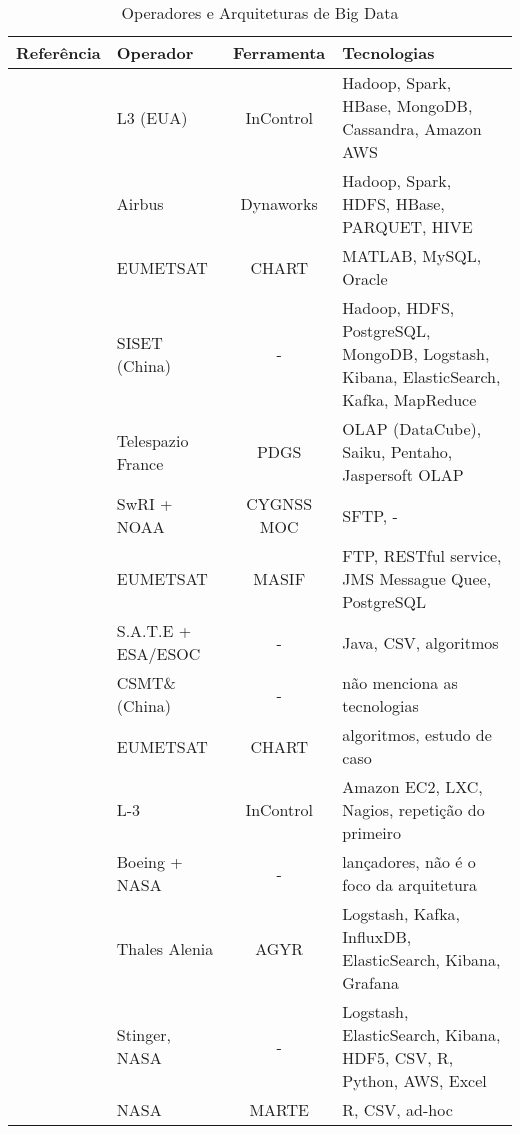 \begin{table}[!ht]%
  \begin{center}
  \caption{Operadores e Arquiteturas de Big Data}
  \begin{tabular}{|C{8em}|C{6em}|c|C{10em}|}
      \hline
	  \bfseries Referência &\bfseries Operador &\bfseries Ferramenta &\bfseries Tecnologias \\
	  \hline
	  \cite{adamskiDataAnalyticsLarge2016} & L3 (EUA) & InControl & Hadoop, Spark, HBase, MongoDB, Cassandra, Amazon AWS \\
	  \hline
	  \cite{boussoufBigDataBased2018} & Airbus & Dynaworks & Hadoop, Spark, HDFS, HBase, PARQUET, HIVE \\
	  \hline
	  \cite{schulsterCHARTingFutureOffline2018} & EUMETSAT & CHART & MATLAB, MySQL, Oracle \\
	  \hline
	  \cite{zhangBigDataFramework2017} & SISET (China) & - & Hadoop, HDFS, PostgreSQL, MongoDB, Logstash, Kibana, ElasticSearch, Kafka, MapReduce \\
	  \hline
	  \cite{yvernesCopernicusGroundSegment2018} & Telespazio France & PDGS & OLAP (DataCube), Saiku, Pentaho, Jaspersoft OLAP \\
	  \hline
	  \cite{dischnerCYGNSSMOCMeeting2016} & SwRI + NOAA & CYGNSS MOC & SFTP, - \\
	  \hline
	  \cite{edwardsDealingBigData2018} & EUMETSAT & MASIF & FTP, RESTful service, JMS Messague Quee, PostgreSQL \\
	  \hline
	  \cite{evansDataMiningDrastically2016} & S.A.T.E + ESA/ESOC & - & Java, CSV, algoritmos \\
	  \hline
	  \cite{fenManagementOperationCommunication2016} & CSMT\& (China) & - & não menciona as tecnologias \\
	  \hline
	  \cite{trollopeAnalysisAutomatedTechniques2018} & EUMETSAT & CHART & algoritmos, estudo de caso \\
	  \hline
	  \cite{gillesFlyingLargeConstellations2016} & L-3 & InControl & Amazon EC2, LXC, Nagios, repetição do primeiro \\
	  \hline
	  \cite{highsmithSpaceLaunchSystem2015} & Boeing + NASA & - & lançadores, não é o foco da arquitetura \\
	  \hline
	  \cite{hennionBigdataSatelliteYearly2018} & Thales Alenia & AGYR & Logstash, Kafka, InfluxDB, ElasticSearch, Kibana, Grafana \\
	  \hline
	  \cite{mateikUsingBigData2017} & Stinger, NASA & - & Logstash, ElasticSearch, Kibana, HDF5, CSV, R, Python, AWS, Excel \\
	  \hline
	  \cite{fernandezTelemetryAnomalyDetection2017} & NASA & MARTE & R, CSV, ad-hoc \\
	  \hline
    \end{tabular}
    \end{center}
  \label{table:bigdataoperators}
\end{table}

